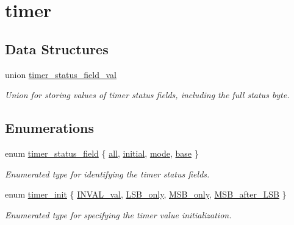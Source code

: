 \hypertarget{group__timer}{}\section{timer}
\label{group__timer}
\subsection*{Data Structures}
\begin{DoxyCompactItemize}
\item 
union \mbox{\hyperlink{uniontimer__status__field__val}{timer\+\_\+status\+\_\+field\+\_\+val}}
\begin{DoxyCompactList}\small\item\em Union for storing values of timer status fields, including the full status byte. \end{DoxyCompactList}\end{DoxyCompactItemize}
\subsection*{Enumerations}
\begin{DoxyCompactItemize}
\item 
enum \mbox{\hyperlink{group__timer_gada782f3116a896caaa602b70c0c6d8b7}{timer\+\_\+status\+\_\+field}} \{ \mbox{\hyperlink{group__timer_ggada782f3116a896caaa602b70c0c6d8b7a8701c301e7c87ec4d4f3aee33c6128d7}{all}}, 
\mbox{\hyperlink{group__timer_ggada782f3116a896caaa602b70c0c6d8b7a6c39f4aa1a0747304627e85d357f4bc8}{initial}}, 
\mbox{\hyperlink{group__timer_ggada782f3116a896caaa602b70c0c6d8b7af1982b2b77f9b0e7cd29e39b39d8a0b4}{mode}}, 
\mbox{\hyperlink{group__timer_ggada782f3116a896caaa602b70c0c6d8b7a27df5ef1a125f452469fe47a7158cb16}{base}}
 \}
\begin{DoxyCompactList}\small\item\em Enumerated type for identifying the timer status fields. \end{DoxyCompactList}\item 
enum \mbox{\hyperlink{group__timer_ga5cc20f14fd50625eea9b20f58fbe2a55}{timer\+\_\+init}} \{ \mbox{\hyperlink{group__timer_gga5cc20f14fd50625eea9b20f58fbe2a55a829d958875d8e92068f1b07f858721a4}{I\+N\+V\+A\+L\+\_\+val}}, 
\mbox{\hyperlink{group__timer_gga5cc20f14fd50625eea9b20f58fbe2a55a9a2e8b22f6d5ee33cc37829164a55955}{L\+S\+B\+\_\+only}}, 
\mbox{\hyperlink{group__timer_gga5cc20f14fd50625eea9b20f58fbe2a55ae46d93c3576b5f78ae1aeb4ee4fc4938}{M\+S\+B\+\_\+only}}, 
\mbox{\hyperlink{group__timer_gga5cc20f14fd50625eea9b20f58fbe2a55a7d392c02b4f52d93c10e4c646f8cedc7}{M\+S\+B\+\_\+after\+\_\+\+L\+SB}}
 \}
\begin{DoxyCompactList}\small\item\em Enumerated type for specifying the timer value initialization. \end{DoxyCompactList}\end{DoxyCompactItemize}
